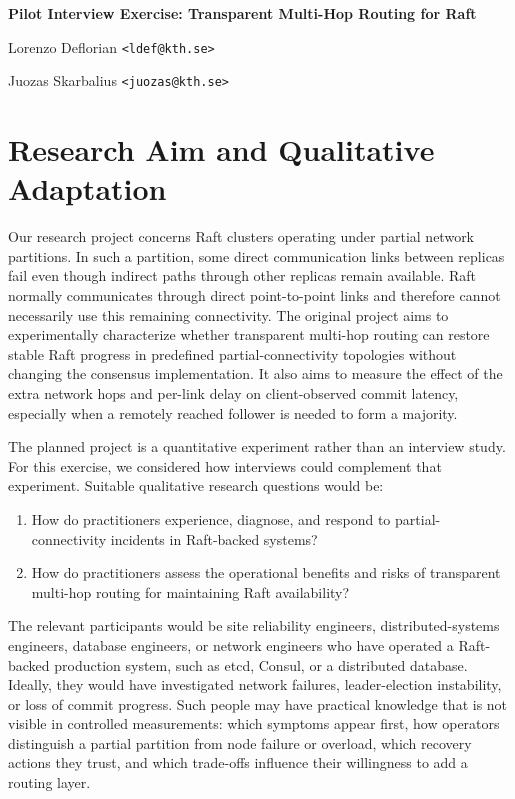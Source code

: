 \documentclass[11pt,a4paper]{article}
\newcommand{\unnumberedheading}[1]{%
  \par\vspace{2pt}{\fontsize{14}{16.5}\selectfont\bfseries #1\par}\vspace{6pt}%
}
\newcommand{\reporttitle}[1]{%
  {\fontsize{16}{19}\selectfont\bfseries #1\par}\vspace{12pt}%
}
\begin{document}
\reporttitle{Pilot Interview Exercise: Transparent Multi-Hop Routing for Raft}
\unnumberedheading{Authors}
Lorenzo Deflorian \texttt{<ldef@kth.se>}\par
Juozas Skarbalius \texttt{<juozas@kth.se>}\par
\vspace{2pt}

\section{Research Aim and Qualitative Adaptation}

Our research project concerns Raft clusters operating under partial network partitions. In such a partition, some direct communication links between replicas fail even though indirect paths through other replicas remain available. Raft normally communicates through direct point-to-point links and therefore cannot necessarily use this remaining connectivity. The original project aims to experimentally characterize whether transparent multi-hop routing can restore stable Raft progress in predefined partial-connectivity topologies without changing the consensus implementation. It also aims to measure the effect of the extra network hops and per-link delay on client-observed commit latency, especially when a remotely reached follower is needed to form a majority.

The planned project is a quantitative experiment rather than an interview study. For this exercise, we considered how interviews could complement that experiment. Suitable qualitative research questions would be:

\begin{enumerate}
  \item How do practitioners experience, diagnose, and respond to partial-connectivity incidents in Raft-backed systems?
  \item How do practitioners assess the operational benefits and risks of transparent multi-hop routing for maintaining Raft availability?
\end{enumerate}

The relevant participants would be site reliability engineers, distributed-systems engineers, database engineers, or network engineers who have operated a Raft-backed production system, such as etcd, Consul, or a distributed database. Ideally, they would have investigated network failures, leader-election instability, or loss of commit progress. Such people may have practical knowledge that is not visible in controlled measurements: which symptoms appear first, how operators distinguish a partial partition from node failure or overload, which recovery actions they trust, and which trade-offs influence their willingness to add a routing layer.
\end{document}
